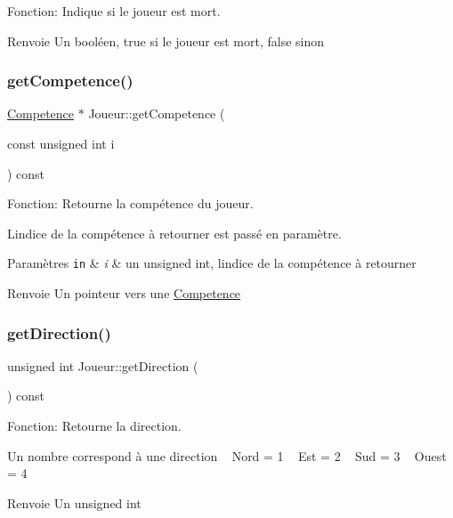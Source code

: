 Fonction\+: Indique si le joueur est mort. 

\begin{DoxyReturn}{Renvoie}
Un booléen, true si le joueur est mort, false sinon 
\end{DoxyReturn}
\mbox{\label{classJoueur_a16549832c2daff14fc2b51ecdc3e15ee}} 
\subsubsection{\texorpdfstring{get\+Competence()}{getCompetence()}}
{\footnotesize\ttfamily \mbox{\hyperlink{structCompetence}{Competence}} $\ast$ Joueur\+::get\+Competence (\begin{DoxyParamCaption}\item[{const unsigned int}]{i }\end{DoxyParamCaption}) const}



Fonction\+: Retourne la compétence du joueur. 

L\textquotesingle{}indice de la compétence à retourner est passé en paramètre. 
\begin{DoxyParams}[1]{Paramètres}
\mbox{\tt in}  & {\em i} & un unsigned int, l\textquotesingle{}indice de la compétence à retourner \\
\hline
\end{DoxyParams}
\begin{DoxyReturn}{Renvoie}
Un pointeur vers une \mbox{\hyperlink{structCompetence}{Competence}} 
\end{DoxyReturn}
\mbox{\label{classJoueur_a26b77ddad57c8aafd43d3bd0e192a75f}} 
\subsubsection{\texorpdfstring{get\+Direction()}{getDirection()}}
{\footnotesize\ttfamily unsigned int Joueur\+::get\+Direction (\begin{DoxyParamCaption}{ }\end{DoxyParamCaption}) const}



Fonction\+: Retourne la direction. 

Un nombre correspond à une direction ~\newline
 Nord = 1 ~\newline
 Est = 2 ~\newline
 Sud = 3 ~\newline
 Ouest = 4 ~\newline
 \begin{DoxyReturn}{Renvoie}
Un unsigned int 
\end{DoxyReturn}
\mbox{\label{classJoueur_aca3db9562eeb1ca44522109610b9cd80}} 

